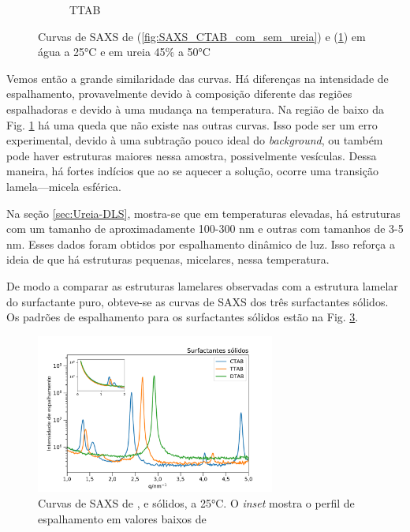 \begin{figure}[h]
\begin{subfigure}[t]{0.45\textwidth}
			\caption{TTAB}
			\label{fig:SAXS_TTAB_com_sem_ureia}
		\end{subfigure}
		\caption{Curvas de SAXS de \CTAB{} (\ref{fig:SAXS_CTAB_com_sem_ureia}) e \TTAB{} (\ref{fig:SAXS_TTAB_com_sem_ureia}) em água a 25°C e em ureia 45\% a 50°C}
		\label{fig:SAXS_com_sem_ureia}
	\end{figure}
	
	Vemos então a grande similaridade das curvas. Há diferenças na intensidade de espalhamento, provavelmente devido à composição diferente das regiões espalhadoras e devido à uma mudança na temperatura. Na região de baixo \q{} da Fig. \ref{fig:SAXS_TTAB_com_sem_ureia} há uma queda que não existe nas outras curvas. Isso pode ser um erro experimental, devido à uma subtração pouco ideal do \emph{background}, ou também pode haver estruturas maiores nessa amostra, possivelmente vesículas. Dessa maneira, há fortes indícios que ao se aquecer a solução, ocorre uma transição lamela---micela esférica.
	
	Na seção \ref{sec:Ureia-DLS}, mostra-se que em temperaturas elevadas, há estruturas com um tamanho de aproximadamente 100-300 nm e outras com tamanhos de 3-5 nm. Esses dados foram obtidos por espalhamento dinâmico de luz. Isso reforça a ideia de que há estruturas pequenas, micelares, nessa temperatura.

	 
	De modo a comparar as estruturas lamelares observadas com a estrutura lamelar do surfactante puro, obteve-se as curvas de SAXS dos três surfactantes sólidos. Os padrões de espalhamento para os surfactantes sólidos estão na Fig. \ref{fig:SAXS_surf_sólido}.

	\begin{figure}[h]
		\centering
		\includegraphics[width=0.7\textwidth]{imagens/saxs/surfactante_solido}
		\caption{Curvas de SAXS de \CTAB{}, \TTAB{} e \DTAB{} sólidos, a 25°C. O \emph{inset} mostra o perfil de espalhamento em valores baixos de \q}
		\label{fig:SAXS_surf_sólido}
	\end{figure}  %
	
